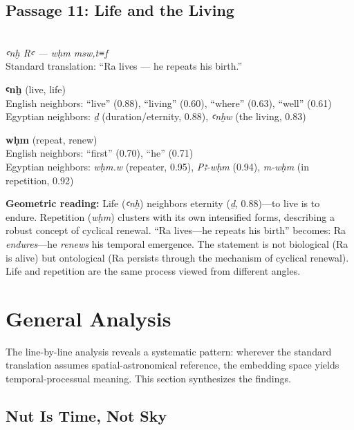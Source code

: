 \documentclass[11pt, a4paper]{article}
\newcommand{\passagehiero}[1]{{\normalfont\hierofont\fontsize{14}{17}\selectfont #1}}
\begin{document}
\subsection{Passage 11: Life and the Living}

{\color{passage}\passagehiero{𓋹 𓇳𓏤 --- 𓅱𓎛𓅓 𓅓𓊃𓅱𓏏𓆑}\\\medskip
\textit{\small ꜥnḫ Rꜥ --- wḥm msw,t≡f}\\
Standard translation: ``Ra lives --- he repeats his birth.''}

\bigskip

\noindent\textbf{ꜥnḫ} (live, life)\\
English neighbors: ``live'' (0.88), ``living'' (0.60), ``where'' (0.63), ``well'' (0.61)\\
Egyptian neighbors: \textit{ḏ} (duration/eternity, 0.88), \textit{ꜥnḫw} (the living, 0.83)

\medskip

\noindent\textbf{wḥm} (repeat, renew)\\
English neighbors: ``first'' (0.70), ``he'' (0.71)\\
Egyptian neighbors: \textit{wḥm.w} (repeater, 0.95), \textit{Pꜣ-wḥm} (0.94), \textit{m-wḥm} (in repetition, 0.92)

\medskip

{\color{insight}\textbf{Geometric reading:}} Life (\textit{ꜥnḫ}) neighbors eternity (\textit{ḏ}, 0.88)---to live is to endure. Repetition (\textit{wḥm}) clusters with its own intensified forms, describing a robust concept of cyclical renewal. ``Ra lives---he repeats his birth'' becomes: Ra \textit{endures}---he \textit{renews} his temporal emergence. The statement is not biological (Ra is alive) but ontological (Ra persists through the mechanism of cyclical renewal). Life and repetition are the same process viewed from different angles.

\section{General Analysis}
\label{sec:general}

The line-by-line analysis reveals a systematic pattern: wherever the standard translation assumes spatial-astronomical reference, the embedding space yields temporal-processual meaning. This section synthesizes the findings.

\subsection{Nut Is Time, Not Sky}
\end{document}
